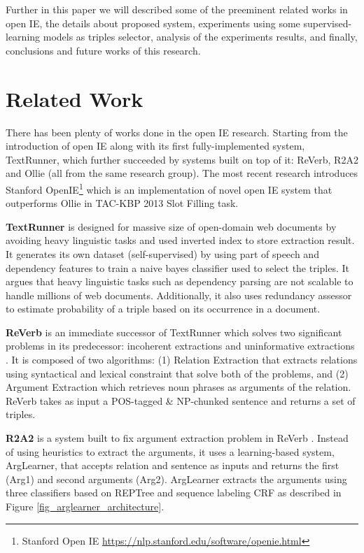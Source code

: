 \documentclass[conference,compsoc,12pt]{IEEEtran}
\begin{document}
Further in this paper we will described some of the preeminent related works in open IE, the details about proposed system, experiments using some supervised-learning models as triples selector, analysis of the experiments results, and finally, conclusions and future works of this research.

\section{Related Work}

There has been plenty of works done in the open IE research. Starting from the introduction of open IE along with its first fully-implemented system, TextRunner\cite{banko2007open}, which further succeeded by systems built on top of it: ReVerb, R2A2\cite{etzioni2011open} and Ollie\cite{schmitz2012open} (all from the same research group). The most recent research introduces Stanford OpenIE\footnote{Stanford Open IE \url{https://nlp.stanford.edu/software/openie.html}} which is an implementation of novel open IE system that outperforms Ollie in TAC-KBP
2013 Slot Filling task\cite{angeli2015leveraging}.

\textbf{TextRunner} is designed for massive size of open-domain web documents by avoiding heavy linguistic tasks and used inverted index to store extraction result\cite{banko2007open}. It generates its own dataset (self-supervised) by using part of speech and dependency features to train a naive bayes classifier used to select the triples. It argues that heavy linguistic tasks such as dependency parsing are not scalable to handle millions of web documents. Additionally, it also uses redundancy assessor to estimate probability of a triple based on its occurrence in a document.

\textbf{ReVerb} is an immediate successor of TextRunner which solves two significant problems in its predecessor: incoherent extractions and uninformative extractions \cite{fader2011identifying}. It is composed of two algorithms: (1) Relation Extraction that extracts relations using syntactical and lexical constraint that solve both of the problems, and (2) Argument Extraction which retrieves noun phrases as arguments of the relation. ReVerb takes as input a POS-tagged \& NP-chunked sentence and returns a set of triples.

\textbf{R2A2} is a system built to fix argument extraction problem in ReVerb \cite{etzioni2011open}. Instead of using heuristics to extract the arguments, it uses a learning-based system, ArgLearner, that accepts relation and sentence as inputs and returns the first (Arg1) and second arguments (Arg2). ArgLearner extracts the arguments using three classifiers based on REPTree and sequence labeling CRF as described in Figure \ref{fig_arglearner_architecture}.
\end{document}
